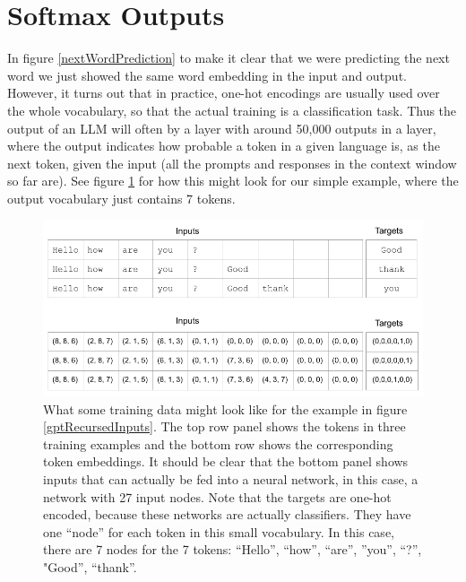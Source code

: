 \section{Softmax Outputs}

In figure \ref{nextWordPrediction} to make it clear that we were predicting the next word we just showed the same word embedding in the input and output.  However, it turns out that in practice, one-hot encodings are usually used over the whole vocabulary, so that the actual training is a classification task. Thus the output of an LLM will often by a layer with around 50,000 outputs in a  layer, where the output indicates how probable a token in a given language is, as the next token, given the input (all the prompts and responses in the context window so far are). See figure \ref{contextWindow} for how this might look for our simple example, where the output vocabulary just contains 7 tokens.

\begin{figure}[h]
\centering
\includegraphics[scale=.45]{./images/contextWindow.png}
\caption[Jeff Yoshimi]{What some training data might look like for the example in figure \ref{gptRecursedInputs}. The top row panel shows the tokens in three training examples and the bottom row shows the corresponding token embeddings.  It should be clear that the bottom panel shows inputs that can actually be fed into a neural network, in this case, a network with 27 input nodes. Note that the targets are one-hot encoded, because these networks are actually classifiers. They have one ``node'' for each token in this small vocabulary. In this case, there are 7 nodes for the 7 tokens: ``Hello'', ``how'', ``are'', ''you'', ``?'', "Good'', ``thank''.  }
\label{contextWindow}
\end{figure}


